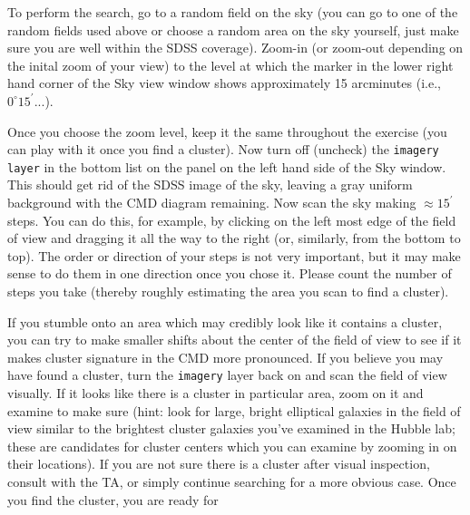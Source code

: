 \documentclass[12pt]{article}
\begin{document}
To perform the search, go to a random field on the sky (you can go to one
of the random fields used above or choose a random area on the sky yourself, 
just make sure you are well within the SDSS coverage). Zoom-in (or zoom-out
depending on the inital zoom of your view) to the level 
at which the marker in the lower right hand corner of the Sky view window
shows approximately 15 arcminutes (i.e., $0^{\circ}15^{'}...$). 

Once you choose
the zoom level, keep it the same throughout the exercise (you can play with it
once you find a cluster). 
Now turn off (uncheck) the \texttt{imagery layer} in the bottom list
on the panel on the left hand side of the Sky window.  This should get
rid of the SDSS image of the sky, leaving a gray uniform background
with the CMD diagram remaining. Now scan the sky making $\approx
15^{'}$ steps.  You can do this, for example, by clicking on the left
most edge of the field of view and dragging it all the way to the
right (or, similarly, from the bottom to top). The order or direction of your steps
is not very important, but it may make sense to do them in one direction once you chose
it. Please count the number of steps you take (thereby roughly estimating the
area you scan to find a cluster). 

If you stumble onto an area which may credibly look like it contains a
cluster, you can try to make smaller shifts about the center of the
field of view to see if it makes cluster signature in the CMD more
pronounced. If you believe you may have found a cluster, turn the
\texttt{imagery} layer back on and scan the field of view visually. If
it looks like there is a cluster in particular area, zoom on it and
examine to make sure (hint: look for large, bright elliptical galaxies
in the field of view similar to the brightest cluster galaxies you've examined in the
Hubble lab; these are candidates for cluster centers which you can examine by 
zooming in on their locations). If you are not sure there is a cluster after visual
inspection, consult with the TA, or simply continue searching for a
more obvious case. Once you find the cluster, you are ready for\\[2mm]
\end{document}
